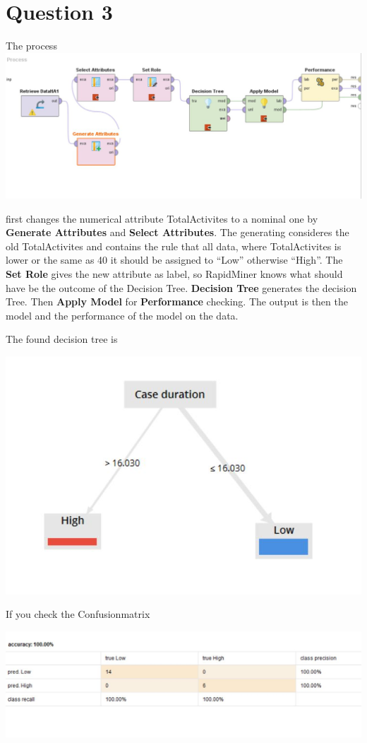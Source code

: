 \section*{Question 3}
The process
\includegraphics[width=\textwidth]{Question3Process.jpg}

first changes the numerical attribute TotalActivites to a nominal one by
\textbf{Generate Attributes} and \textbf{Select Attributes}. The generating
consideres the old TotalActivites and contains the rule that all data, where
TotalActivites is lower or the same as 40 it should be assigned to ``Low''
otherwise ``High''. The \textbf{Set Role} gives the new attribute as label, so
RapidMiner knows what should have be the outcome of the Decision Tree.
\textbf{Decision Tree} generates the decision Tree. Then \textbf{Apply Model}
for \textbf{Performance} checking. The output is then the model and the
performance of the model on the data.

The found decision tree is 

\includegraphics[width=\textwidth]{Question3Deci.jpg}

If you check the Confusionmatrix

\includegraphics[width=\textwidth]{Question3Confusion.jpg}

